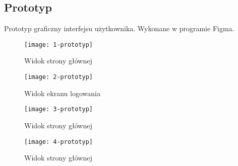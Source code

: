 \subsection{Prototyp}
    Prototyp graficzny interfejsu użytkownika. Wykonane w programie Figma.
    \begin{flushleft}
        \begin{figure}[!htb]
            \centering
            \texttt{[image: 1-prototyp]}
            \caption{Widok strony głównej}
        \end{figure}

        \begin{figure}[!htb]
            \centering
            \texttt{[image: 2-prototyp]}
            \caption{Widok ekranu logowania}
        \end{figure}

        \begin{figure}[!htb]
            \centering
            \texttt{[image: 3-prototyp]}
            \caption{Widok strony głównej}
        \end{figure}

        \begin{figure}[!htb]
            \centering
            \texttt{[image: 4-prototyp]}
            \caption{Widok strony głównej}
        \end{figure}   
    \end{flushleft}
